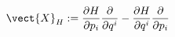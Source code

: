 \begin{equation}
  \vect{X}_H := \frac{\partial H}{\partial p_i}
    \frac{\partial}{\partial q^i}
  - \frac{\partial H}{\partial q^i}\frac{\partial}{\partial p_i}
\end{equation}

